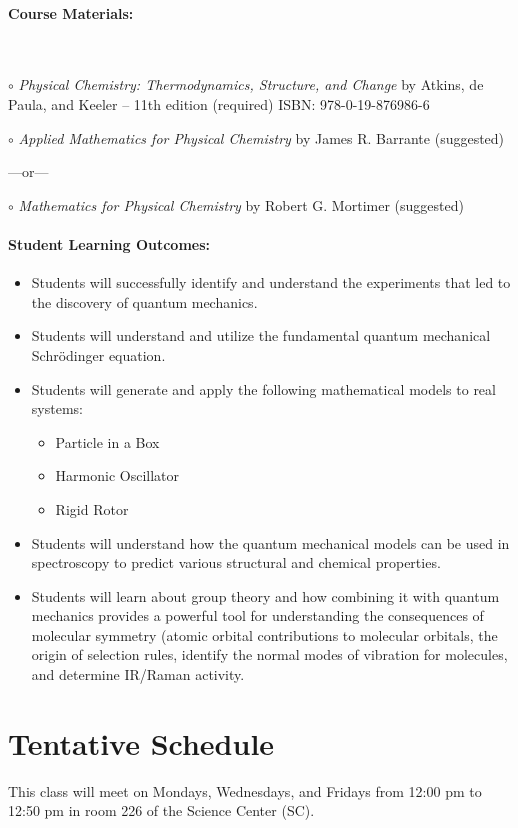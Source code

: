 \documentclass[12pt, letterpaper]{article}
\begin{document}
\paragraph{Course Materials:} ~

$\circ$ \emph{Physical Chemistry: Thermodynamics, Structure, and Change} by Atkins, de Paula, and Keeler -- 11th edition (required) ISBN: 978-0-19-876986-6

$\circ$ \emph{Applied Mathematics for Physical Chemistry} by James R. Barrante (suggested)

\vspace{-4pt}
---or---

\vspace{-4pt}
$\circ$ \emph{Mathematics for Physical Chemistry} by Robert G. Mortimer (suggested)

\paragraph{Student Learning Outcomes:}
\begin{itemize}
	\item{Students will successfully identify and understand the experiments that led to the discovery of quantum mechanics.}
	\item{Students will understand and utilize the fundamental quantum mechanical Schrödinger equation.}
	\item{Students will generate and apply the following mathematical models to real systems:}
	\begin{itemize}
		\item{Particle in a Box}
		\item{Harmonic Oscillator}
		\item{Rigid Rotor}
	\end{itemize}
	\item{Students will understand how the quantum mechanical models can be used in spectroscopy to predict various structural and chemical properties.}
	\item{Students will learn about group theory and how combining it with quantum mechanics provides a powerful tool for understanding the consequences of molecular symmetry (atomic orbital contributions to molecular orbitals, the origin of selection rules, identify the normal modes of vibration for molecules, and determine IR/Raman activity.}
\end{itemize}

\section*{Tentative Schedule}
This class will meet on Mondays, Wednesdays, and Fridays from 12:00 pm to 12:50 pm in room 226 of the Science Center (SC).
\end{document}
